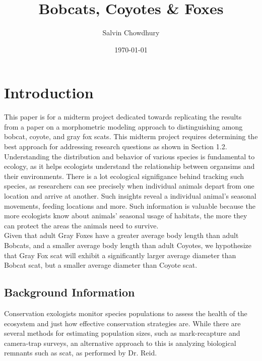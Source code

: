 \documentclass[a4paper]{article}
\title{Bobcats, Coyotes \& Foxes}
\author{Salvin Chowdhury}
\date{\today}
\begin{document}
\setlength{\intextsep}{0pt} 
\setlength{\textfloatsep}{5pt} 

\maketitle
\tableofcontents
\newpage

\section{Introduction}
This paper is for a midterm project dedicated towards replicating the results from a paper on a morphometric modeling approach to distinguishing among
bobcat, coyote, and gray fox scats. This midterm project requires determining the best approach for addressing research questions as shown in Section 1.2. \\

\noindent Understanding the distribution and behavior of various species is fundamental to ecology, as it helps ecologists understand the relationship between
organsims and their environments. There is a lot ecological signifigance behind tracking such species, as researchers can see precisely when individual 
animals depart from one location and arrive at another. Such insights reveal a individual animal's seasonal movements, feeding locations and more. Such
information is valuable because the more ecologists know about animals' seasonal usage of habitats, the more they can protect the areas the animals need to
survive. \\

\noindent Given that adult Gray Foxes have a greater average body length than adult Bobcats, and a smaller average body length than adult Coyotes, we hypothesize 
that Gray Fox scat will exhibit a significantly larger average diameter than Bobcat scat, but a smaller average diameter than Coyote scat.

\subsection{Background Information}
Conservation exologists monitor species populations to assess the health of the ecosystem and just how effective conservation strategies are. While there are
several methods for estimating population sizes, such as mark-recapture and camera-trap surveys, an alternative approach to this is analyzing biological 
remnants such as scat, as performed by Dr. Reid. \\
\end{document}
